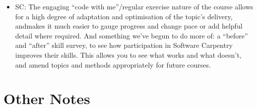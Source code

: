 \documentclass{article}
\begin{document}
\begin{itemize}
  \item SC: The engaging ``code with me''/regular exercise nature of
    the course allows for a high degree of adaptation and optimisation
    of the topic's delivery, andmakes it much easier to gauge progress
    and change pace or add helpful detail where required.  And
    something we've begun to do more of: a ``before'' and ``after''
    skill survey, to see how participation in Software Carpentry
    improves their skills. This allows you to see what works and what
    doesn't, and amend topics and methods appropriately for future
    courses.

\end{itemize}

\section{Other Notes}
\end{document}
